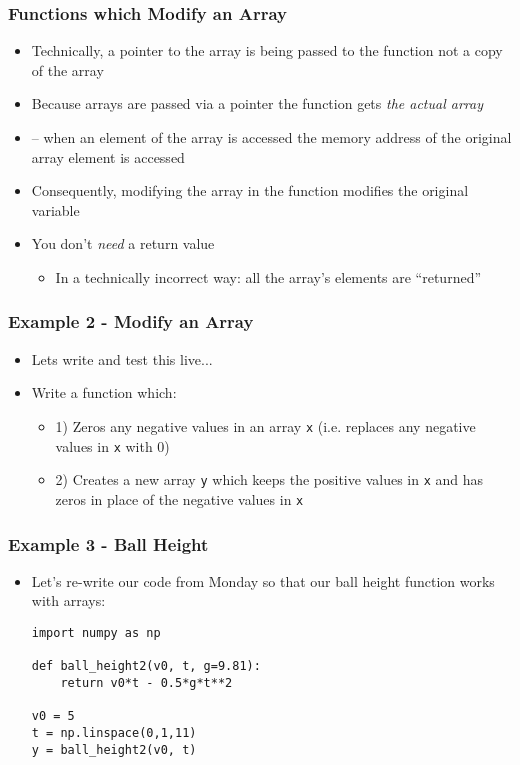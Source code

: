 \documentclass[english,14pt]{beamer}
\begin{document}
\begin{frame}
\frametitle{Functions which Modify an Array}
\begin{itemize}
\item Technically, a pointer to the array is being passed to the function not a copy of the array
\item Because arrays are passed via a pointer the function gets \textit{the actual array}
\item --  when an element of the array is accessed the memory address of the original array element is accessed
\item Consequently, modifying the array in the function modifies the original variable
\item You don't \textit{need} a return value
	\begin{itemize}
		\item In a technically incorrect way: all the array's elements are ``returned''
	\end{itemize}
\end{itemize}
\end{frame}

\begin{frame}
\frametitle{Example 2 - Modify an Array}
\begin{itemize}
\item Lets write and test this live...
\item Write a function which:
	\begin{itemize}	
		\item 1) Zeros any negative values in an array \texttt{x} (i.e. replaces any negative values in \texttt{x} with 0)
		\item 2) Creates a new array \texttt{y} which keeps the positive values in \texttt{x} and has zeros in place of the negative values in \texttt{x}
	\end{itemize}
\end{itemize}
\end{frame}

\begin{frame}[fragile]
\frametitle{Example 3 - Ball Height}
\begin{itemize}
\item Let's re-write our code from Monday so that our ball height function works with arrays:
\begin{lstlisting}[style=CStyle]
import numpy as np
            
def ball_height2(v0, t, g=9.81):    
    return v0*t - 0.5*g*t**2      
    
v0 = 5
t = np.linspace(0,1,11)
y = ball_height2(v0, t)  
\end{lstlisting}
	\end{itemize}
\end{frame}
\end{document}
